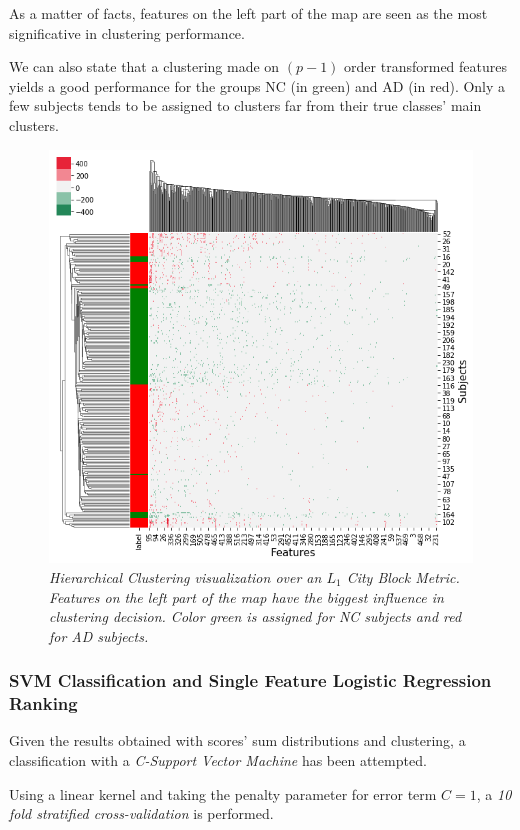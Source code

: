 \documentclass[12pt,openright,twoside,a4paper]{book}
\begin{document}
As a matter of facts, features on the left part of the map are seen as the most significative in clustering performance.

We can also state that a clustering made on $(p-1)$ order transformed features yields a good performance for the groups NC (in green) and AD (in red). Only a few subjects tends to be assigned to clusters far from their true classes' main clusters.

\begin{figure}[!h]
\centering
\includegraphics[scale=0.5]{diff-logpdf-clustering10}
\caption{\textit{Hierarchical Clustering visualization over an $L_1$ City Block Metric. Features on the left part of the map have the biggest influence in clustering decision. Color green is assigned for NC subjects and red for AD subjects.}}
\label{ADNI-cluster}
\end{figure}

\subsubsection*{SVM Classification and Single Feature Logistic Regression Ranking}

Given the results obtained with scores' sum distributions and clustering, a classification with a \textit{C-Support Vector Machine} has been attempted. 

Using a linear kernel and taking the penalty parameter for error term $C=1$, a \textit{10 fold stratified cross-validation} is performed.
\end{document}
